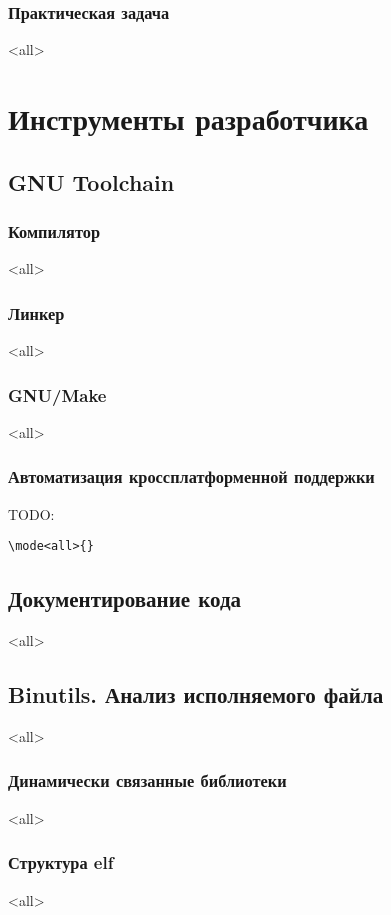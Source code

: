 \section{Практическая задача}
\mode<all>{}

\part{Инструменты разработчика}
\chapter{GNU Toolchain}
\section{Компилятор}
\mode<all>{}
\section{Линкер}
\mode<all>{}
\section{GNU/Make}
\mode<all>{}

\section{Автоматизация кроссплатформенной поддержки}
TODO: 
\begin{verbatim}
\mode<all>{}
\end{verbatim}

\chapter{Документирование кода}
\mode<all>{}

\chapter{Binutils. Анализ исполняемого файла}
\mode<all>{}
\section{Динамически связанные библиотеки}
\mode<all>{}
\section{Структура elf}
\mode<all>{}
